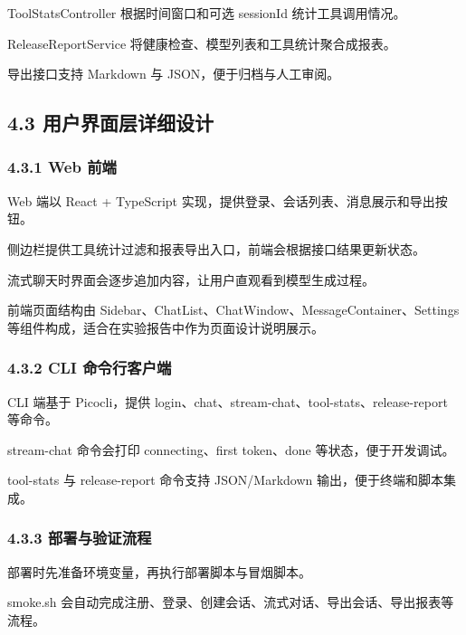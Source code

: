 \documentclass[UTF8]{ctexart}
\begin{document}
ToolStatsController 根据时间窗口和可选 sessionId 统计工具调用情况。

ReleaseReportService 将健康检查、模型列表和工具统计聚合成报表。

导出接口支持 Markdown 与 JSON，便于归档与人工审阅。

\subsection{\texorpdfstring{\textbf{4.3
用户界面层详细设计}}{4.3 用户界面层详细设计}}\label{ux7528ux6237ux754cux9762ux5c42ux8be6ux7ec6ux8bbeux8ba1}

\subsubsection{\texorpdfstring{\textbf{4.3.1 Web
前端}}{4.3.1 Web 前端}}\label{web-ux524dux7aef}

Web 端以 React + TypeScript
实现，提供登录、会话列表、消息展示和导出按钮。

侧边栏提供工具统计过滤和报表导出入口，前端会根据接口结果更新状态。

流式聊天时界面会逐步追加内容，让用户直观看到模型生成过程。

前端页面结构由 Sidebar、ChatList、ChatWindow、MessageContainer、Settings
等组件构成，适合在实验报告中作为页面设计说明展示。

\subsubsection{\texorpdfstring{\textbf{4.3.2 CLI
命令行客户端}}{4.3.2 CLI 命令行客户端}}\label{cli-ux547dux4ee4ux884cux5ba2ux6237ux7aef}

CLI 端基于 Picocli，提供
login、chat、stream-chat、tool-stats、release-report 等命令。

stream-chat 命令会打印 connecting、first token、done
等状态，便于开发调试。

tool-stats 与 release-report 命令支持 JSON/Markdown
输出，便于终端和脚本集成。

\subsubsection{\texorpdfstring{\textbf{4.3.3
部署与验证流程}}{4.3.3 部署与验证流程}}\label{ux90e8ux7f72ux4e0eux9a8cux8bc1ux6d41ux7a0b}

部署时先准备环境变量，再执行部署脚本与冒烟脚本。

smoke.sh
会自动完成注册、登录、创建会话、流式对话、导出会话、导出报表等流程。
\end{document}
